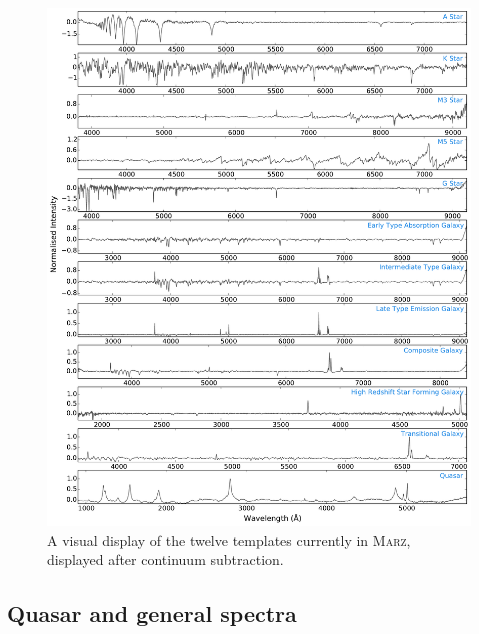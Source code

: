 \documentclass[iop]{emulateapj}
\newcommand{\marz}{\textsc{Marz}}
\begin{document}
\begin{figure}[h!]
\centering
\includegraphics[width=\textwidth]{templates.pdf}
\caption{A visual display of the twelve templates currently in \marz{}, displayed after continuum subtraction.}
\label{fig:templates}
\end{figure}




\subsection{Quasar and general spectra}
\end{document}
